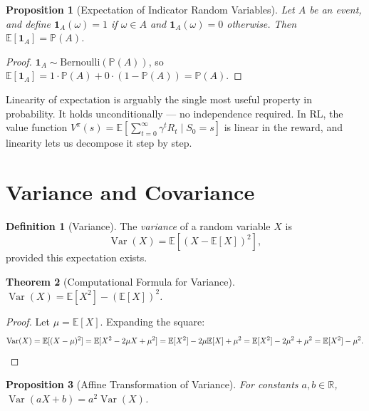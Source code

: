 \documentclass[11pt,a4paper]{article}
\theoremstyle{definition}
\newtheorem{definition}{Definition}[section]
\theoremstyle{plain}
\newtheorem{theorem}{Theorem}[section]
\newtheorem{proposition}[theorem]{Proposition}
\theoremstyle{remark}
\newcommand{\R}{\mathbb{R}}
\newcommand{\E}{\mathbb{E}}
\newcommand{\Prob}{\mathbb{P}}
\DeclareMathOperator{\Var}{Var}
\newcommand{\indicator}{\mathbf{1}}
\begin{document}
\begin{proposition}[Expectation of Indicator Random Variables]
\label{prop:indicator_expectation}
Let $A$ be an event, and define $\indicator_A(\omega) = 1$ if $\omega \in A$ and
$\indicator_A(\omega) = 0$ otherwise. Then $\E[\indicator_A] = \Prob(A)$.
\end{proposition}

\begin{proof}
$\indicator_A \sim \mathrm{Bernoulli}(\Prob(A))$, so
$\E[\indicator_A] = 1 \cdot \Prob(A) + 0 \cdot (1 - \Prob(A)) = \Prob(A)$.
\end{proof}

\begin{keyresult}
Linearity of expectation is arguably the single most useful property in probability. It
holds unconditionally --- no independence required. In RL, the value function
$V^\pi(s) = \E\!\left[\sum_{t=0}^\infty \gamma^t R_t \mid S_0 = s\right]$ is linear in the
reward, and linearity lets us decompose it step by step.
\end{keyresult}

\section{Variance and Covariance}
\label{sec:variance}

\begin{definition}[Variance]
\label{def:variance}
The \emph{variance} of a random variable $X$ is
\[
    \Var(X) = \E\!\left[(X - \E[X])^2\right],
\]
provided this expectation exists.
\end{definition}

\begin{theorem}[Computational Formula for Variance]
\label{thm:var_formula}
$\Var(X) = \E[X^2] - (\E[X])^2$.
\end{theorem}

\begin{proof}
Let $\mu = \E[X]$. Expanding the square:
\[
    \Var(X) = \E[(X - \mu)^2] = \E[X^2 - 2\mu X + \mu^2]
    = \E[X^2] - 2\mu\E[X] + \mu^2 = \E[X^2] - 2\mu^2 + \mu^2 = \E[X^2] - \mu^2.
    \qedhere
\]
\end{proof}

\begin{proposition}[Affine Transformation of Variance]
\label{prop:var_affine}
For constants $a, b \in \R$, $\Var(aX + b) = a^2\Var(X)$.
\end{proposition}
\end{document}
